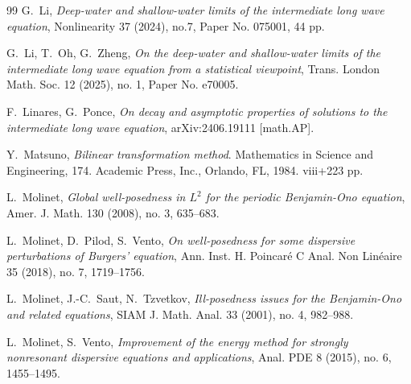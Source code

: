 \documentclass[letterpaper, 11pt,  reqno]{amsart}
\newcommand{\1}{\hspace{0.5mm}\textup{I}\hspace{0.5mm}}
\numberwithin{equation}{section}
\numberwithin{theorem}{section}
\begin{document}
\begin{thebibliography}{99}
%
G.~Li, 
{\it Deep-water and shallow-water limits of the intermediate long wave equation}, 
 Nonlinearity 37 (2024), no.7, Paper No. 075001, 44 pp. 
 
 
G.~Li, T.~Oh, G.~Zheng,
{\it On the deep-water and shallow-water limits of the intermediate long wave equation from a statistical viewpoint}, 
 Trans. London Math. Soc. 12 (2025), no. 1, Paper No. e70005. 




F.~Linares, G.~Ponce,
{\it On decay and asymptotic properties of solutions to the intermediate long wave equation},
arXiv:2406.19111 [math.AP].


Y.~Matsuno, \textit{Bilinear transformation method}. Mathematics in Science and Engineering, 174. Academic
Press, Inc., Orlando, FL, 1984. viii+223 pp.



%
%
%
%
%
%
%
%



L.~Molinet, 
{\it Global well-posedness in $L^2$ for the periodic Benjamin-Ono equation}, 
Amer. J. Math. 130 (2008), no. 3, 635--683. 



L.~Molinet, D.~Pilod, S.~Vento, 
{\it On well-posedness for some dispersive perturbations of Burgers' equation}, 
Ann. Inst. H. Poincar\'e C Anal. Non Lin\'eaire 35 (2018), no. 7, 1719--1756.







L.~Molinet, J.-C.~Saut, N.~Tzvetkov, 
{\it Ill-posedness issues for the Benjamin-Ono and related equations},
SIAM J. Math. Anal. 33 (2001), no. 4, 982--988. 


L.~Molinet, S.~Vento, 
{\it Improvement of the energy method for strongly nonresonant dispersive equations and applications},
 Anal. PDE 8 (2015), no. 6, 1455--1495.





\end{thebibliography}
\end{document}
